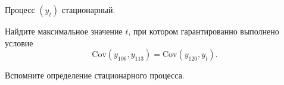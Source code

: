 
\begin{question}
Процесс \((y_t)\) стационарный.

Найдите максимальное значение \(t\), при котором гарантированно выполнено условие
\[
 \mathrm{Cov}(y_{106}, y_{113}) = \mathrm{Cov}(y_{120}, y_t).
\]
\end{question}

\begin{solution}
Вспомните определение стационарного процесса.
\end{solution}

